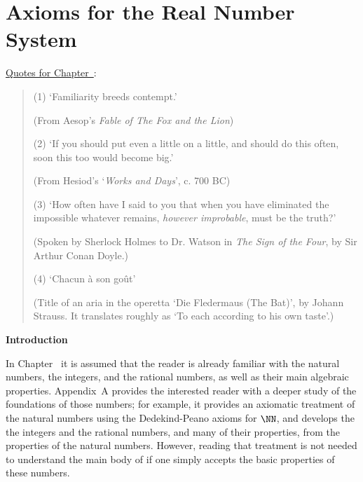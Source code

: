 
%
%


                  \chapter{Axioms for the Real Number System}
                  \label{ChaptB}


        \underline{Quotes for Chapter~}:

\V

\begin{quotation}
{\footnotesize
        (1) `Familiarity breeds contempt.'

        (From Aesop's {\em Fable of The Fox and the Lion}) %


\V

        (2) `If you should put even a little on a little, and should do this often, soon this too would become big.'

        (From Hesiod's `{\em Works and Days}', c. 700 BC)%


\V

        (3) `How often have I said to you that when you have eliminated the impossible whatever remains, {\em however improbable}, must be the truth?'

        (Spoken by Sherlock Holmes to Dr. Watson in {\em The Sign of the Four}, by Sir Arthur Conan Doyle.)%

\V

        (4) `Chacun \`{a} son go\^{u}t'

        (Title of an aria in the operetta `Die Fledermaus (The Bat)', by Johann Strauss. It translates roughly as `To each according to his own taste'.)



}%
\end{quotation}


\VV


            \small{\bf Introduction}

\V

        In Chapter~ it is assumed that the reader is already familiar
    with the natural numbers, the integers, and the rational numbers, as well as their main algebraic properties.
    Appendix~A provides the interested reader with a deeper study of the foundations of those numbers;
    for example, it provides an axiomatic treatment of the natural numbers using the Dedekind-Peano axioms for ${\NN}$,
    and develops the the integers and the rational numbers, and many of their properties, from the properties of the natural numbers.
    However, reading that treatment is not needed to understand the main body of {\TheseNotes} if one simply accepts the basic properties of these numbers.

